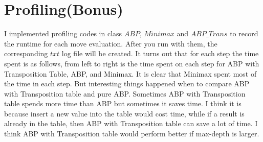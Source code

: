 \documentclass{article}
\begin{document}
\section{Profiling(Bonus)}
I implemented profiling codes in class $ABP$, $Minimax$  and $ABP\_Trans$ to record the runtime for each move evaluation. After you run with them, the corresponding $txt$ log file will be created. It turns out that for each step the time spent is as follows, from left to right is the time spent on each step for ABP with Transposition Table, ABP, and Minimax. It is clear that Minimax spent most of the time in each step. But interesting things happened when to compare ABP with Transposition table and pure ABP. Sometimes ABP with Transposition table spends more time than ABP but sometimes it saves time. I think it is because insert a new value into the table would cost time, while if a result is already in the table, then ABP with Transposition table can save a lot of time. I think ABP with Transposition table would perform better if max-depth is larger.
 
\end{document}
